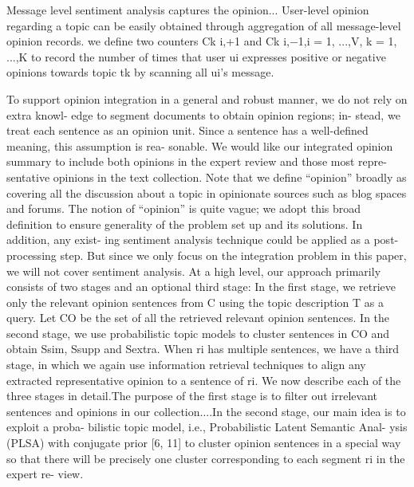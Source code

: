 \documentclass[runningheads,a4paper]{llncs}
\begin{document}
Message level sentiment analysis captures the opinion...
User-level opinion regarding a topic can be easily obtained through aggregation of all message-level opinion records.
we define two counters Ck i,+1 and Ck i,−1,i = 1, ...,V, k = 1, ...,K to record the number of times that user ui expresses positive or negative opinions towards topic tk by scanning all ui’s message.
\cite{li2012mining}

To support opinion integration in a general and robust manner, we do not rely on extra knowl- edge to segment documents to obtain opinion regions; in- stead, we treat each sentence as an opinion unit. Since a sentence has a well-defined meaning, this assumption is rea- sonable. We would like our integrated opinion summary to include both opinions in the expert review and those most repre- sentative opinions in the text collection. 
Note that we define “opinion” broadly as covering all the
discussion about a topic in opinionate sources such as blog spaces and forums. The notion of “opinion” is quite vague; we adopt this broad definition to ensure generality of the problem set up and its solutions. In addition, any exist- ing sentiment analysis technique could be applied as a post- processing step. But since we only focus on the integration problem in this paper, we will not cover sentiment analysis.
At a high level, our approach primarily consists of two stages and an optional third stage: In the first stage, we
retrieve only the relevant opinion sentences from C using the topic description T as a query. Let CO be the set of all the retrieved relevant opinion sentences. In the second stage, we use probabilistic topic models to cluster sentences
in CO and obtain Ssim, Ssupp and Sextra. When ri has multiple sentences, we have a third stage, in which we again use information retrieval techniques to align any extracted representative opinion to a sentence of ri. We now describe each of the three stages in detail.The purpose of the first stage is to filter out irrelevant
sentences and opinions in our collection....In the second stage, our main idea is to exploit a proba-
bilistic topic model, i.e., Probabilistic Latent Semantic Anal- ysis (PLSA) with conjugate prior [6, 11] to cluster opinion sentences in a special way so that there will be precisely one cluster corresponding to each segment ri in the expert re- view.
\end{document}
